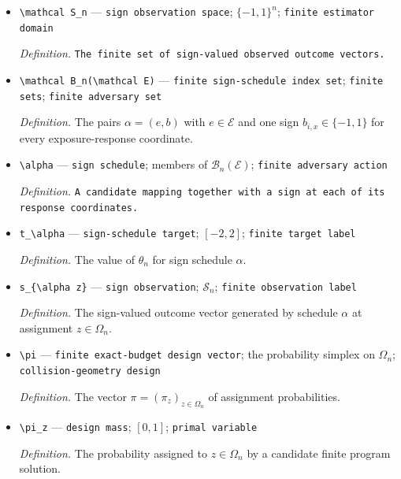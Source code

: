\documentclass{article}
\begin{document}
\begin{itemize}
  \item \texttt{\textbackslash{}\allowbreak{}mathcal S\_\allowbreak{}n} --- \texttt{sign observation space}; \(\{-1,1\}^n\); \texttt{finite estimator domain}
  \par\smallskip\noindent\emph{Definition.} \texttt{The finite set of sign-\allowbreak{}valued observed outcome vectors.}
  \item \texttt{\textbackslash{}\allowbreak{}mathcal B\_\allowbreak{}n(\textbackslash{}\allowbreak{}mathcal E)} --- \texttt{finite sign-\allowbreak{}schedule index set}; \texttt{finite sets}; \texttt{finite adversary set}
  \par\smallskip\noindent\emph{Definition.} The pairs \(\alpha=(e,b)\) with \(e\in\mathcal E\) and one sign \(b_{i,x}\in\{-1,1\}\) for every exposure-response coordinate.
  \item \texttt{\textbackslash{}\allowbreak{}alpha} --- \texttt{sign schedule}; members of \(\mathcal B_n(\mathcal E)\); \texttt{finite adversary action}
  \par\smallskip\noindent\emph{Definition.} \texttt{A candidate mapping together with a sign at each of its response coordinates.}
  \item \texttt{t\_\allowbreak{}\textbackslash{}\allowbreak{}alpha} --- \texttt{sign-\allowbreak{}schedule target}; \([-2,2]\); \texttt{finite target label}
  \par\smallskip\noindent\emph{Definition.} The value of \(\theta_n\) for sign schedule \(\alpha\).
  \item \texttt{s\_\allowbreak{}\{\textbackslash{}\allowbreak{}alpha z\}\allowbreak{}} --- \texttt{sign observation}; \(\mathcal S_n\); \texttt{finite observation label}
  \par\smallskip\noindent\emph{Definition.} The sign-valued outcome vector generated by schedule \(\alpha\) at assignment \(z\in\Omega_n\).
  \item \texttt{\textbackslash{}\allowbreak{}pi} --- \texttt{finite exact-\allowbreak{}budget design vector}; the probability simplex on \(\Omega_n\); \texttt{collision-\allowbreak{}geometry design}
  \par\smallskip\noindent\emph{Definition.} The vector \(\pi=(\pi_z)_{z\in\Omega_n}\) of assignment probabilities.
  \item \texttt{\textbackslash{}\allowbreak{}pi\_\allowbreak{}z} --- \texttt{design mass}; \([0,1]\); \texttt{primal variable}
  \par\smallskip\noindent\emph{Definition.} The probability assigned to \(z\in\Omega_n\) by a candidate finite program solution.

\end{itemize}
\end{document}
